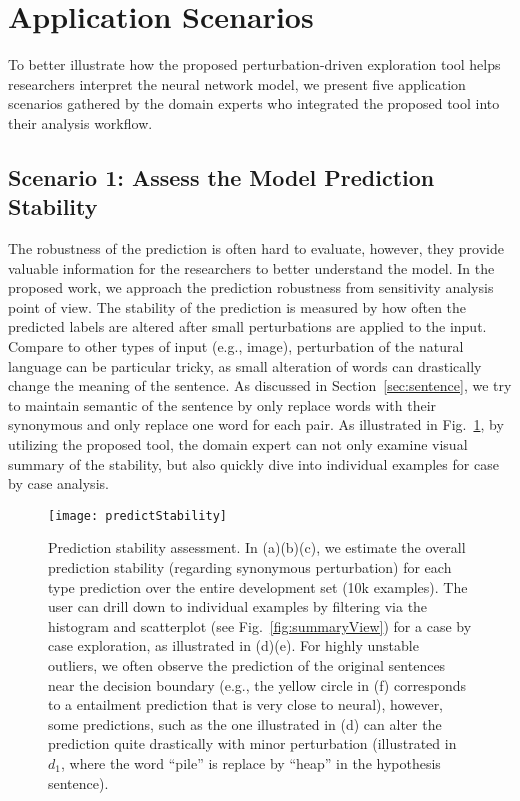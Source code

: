 \section{Application Scenarios}
\label{sec:caseStudy}
To better illustrate how the proposed perturbation-driven exploration tool helps researchers interpret the neural network model, we present five application scenarios gathered by the domain experts who integrated the proposed tool into their analysis workflow.


\subsection{Scenario 1: Assess the Model Prediction Stability}
The robustness of the prediction is often hard to evaluate, however, they provide valuable information for the researchers to better understand the model.
%
In the proposed work, we approach the prediction robustness from sensitivity analysis point of view. The stability of the prediction is measured by how often the predicted labels are altered after small perturbations are applied to the input.
%
Compare to other types of input (e.g., image), perturbation of the natural language can be particular tricky, as small alteration of words can drastically change the meaning of the sentence. As discussed in Section~\ref{sec:sentence}, we try to maintain semantic of the sentence by only replace words with their synonymous and only replace one word for each pair.
As illustrated in Fig.~\ref{fig:predictStability}, by utilizing the proposed tool, the domain expert can not only examine visual summary of the stability, but also quickly dive into individual examples for case by case analysis.

\begin{figure}[htbp]
\centering
 \texttt{[image: predictStability]}
 \caption{
Prediction stability assessment. In (a)(b)(c), we estimate the overall prediction stability (regarding synonymous perturbation) for each type prediction over the entire development set (10k examples). The user can drill down to individual examples by filtering via the histogram and scatterplot (see Fig.~\ref{fig:summaryView}) for a case by case exploration, as illustrated in (d)(e). For highly unstable outliers, we often observe the prediction of the original sentences near the decision boundary (e.g., the yellow circle in (f) corresponds to a entailment prediction that is very close to neural), however, some predictions, such as the one illustrated in (d) can alter the prediction quite drastically with minor perturbation (illustrated in $d_1$, where the word ``pile'' is replace by ``heap'' in the hypothesis sentence).
%
}
\label{fig:predictStability}
\end{figure}

